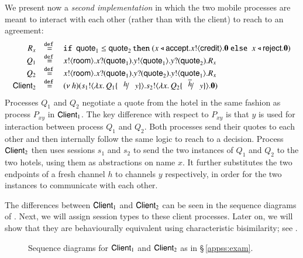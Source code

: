 We present now a \emph{second  implementation}
in which the two mobile processes are meant 
to interact with each other (rather than with the client) to reach to an agreement:
%
\[
	\begin{array}{rcl}
	    R_x & \defeq & \If\ \Quote_1 \leq \Quote_2 \, \Then  (\bsel{x}{\accept} \bout{x}{\creditc} \inact \  \Else \ \bsel{x}{\reject} \inact) \\
		Q_1 &\defeq&	\bout{x}{\rtype} \binp{x}{\Quote_1} \bout{y}{\Quote_1} \binp{y}{\Quote_2} R_x \\
		Q_2 &\defeq&	\bout{x}{\rtype} \binp{x}{\Quote_1} \binp{y}{\Quote_2} \bout{y}{\Quote_1} R_x \\
		\Client_2 &\defeq& \newsp{h}{\bout{s_1}{\abs{x}{Q_1 \subst{h}{y}}} \bout{s_2}{\abs{x}{Q_2 \subst{\dual{h}}{y}}} \inact}
	\end{array}
\]
Processes $Q_1$ and $Q_2$  negotiate a quote from the
		hotel in the same fashion as process $P_{xy}$ in $\mathsf{Client}_1$.
		The key difference with respect to $P_{xy}$ is that $y$ is used for
		interaction between process $Q_1$ and $Q_2$. Both processes send
		their quotes to each other and then internally follow the same
		logic to reach to a decision.
		Process  $\mathsf{Client}_2$ then uses sessions $s_1$ and $s_2$ to send the two
		instances of $Q_1$ and $Q_2$ to the two hotels, using them 
	 as abstractions
		on name $x$. It further substitutes
		the two endpoints of a fresh channel $h$ to channels $y$ respectively,
		in order for the two instances to communicate with each other.



The differences between $\mathsf{Client}_1$ and $\mathsf{Client}_2$ can be  seen in the sequence diagrams of . 
Next, we will assign session types to these client processes. %
Later on, we will show that they are behaviourally equivalent using characteristic bisimilarity;
see .
\begin{figure}[!t]

\caption{Sequence diagrams for $\mathsf{Client}_1$ and $\mathsf{Client}_2$ as in \S\,\ref{appss:exam}\label{fig:exam}.}
\end{figure}


